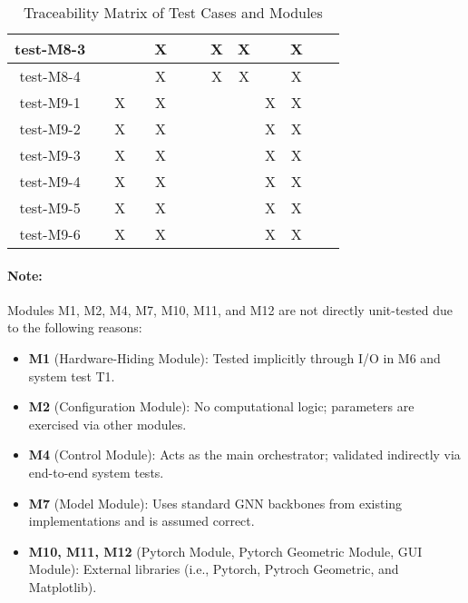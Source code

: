 \documentclass[12pt, titlepage]{article}
\begin{document}
\begin{table}[h!]
\begin{tabular}{|c|c|c|c|c|c|c|c|c|c|c|c|c|}
test-M8-3   &     &     &     &  X   &     &     & X   & X   &     & X   &     &     \\ \hline
test-M8-4   &     &     &     &  X   &     &     & X   & X   &     & X   &     &     \\ \hline
test-M9-1   &     & X   &     &  X   &     &     &     &     & X   & X   &     &     \\ \hline
test-M9-2   &     & X   &     &  X   &     &     &     &     & X   & X   &     &     \\ \hline
test-M9-3   &     & X   &     &  X   &     &     &     &     & X   & X   &     &     \\ \hline
test-M9-4   &     & X   &     &  X   &     &     &     &     & X   & X   &     &     \\ \hline
test-M9-5   &     & X   &     &  X   &     &     &     &     & X   & X   &     &     \\ \hline
test-M9-6   &     & X   &     &  X   &     &     &     &     & X   & X   &     &     \\ \hline
\end{tabular}
\caption{Traceability Matrix of Test Cases and Modules}
\label{Table:trace-test-modules}
\end{table}

\paragraph{Note:}
Modules M1, M2, M4, M7, M10, M11, and M12 are not directly unit-tested due to the following reasons:

\begin{itemize}
  \item \textbf{M1} (Hardware-Hiding Module): Tested implicitly through I/O in M6 and system test T1.
  \item \textbf{M2} (Configuration Module): No computational logic; parameters are exercised via other modules.
  \item \textbf{M4} (Control Module): Acts as the main orchestrator; validated indirectly via end-to-end system tests.
  \item \textbf{M7} (Model Module): Uses standard GNN backbones from existing implementations and is assumed correct.
  \item \textbf{M10, M11, M12} (Pytorch Module, Pytorch Geometric Module, GUI Module): External libraries (i.e., Pytorch, Pytroch Geometric, and Matplotlib).
\end{itemize}
\end{document}
